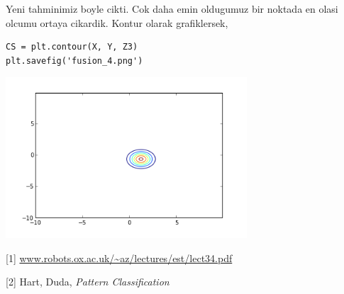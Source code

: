 \documentclass[12pt,fleqn]{article}\usepackage{../common}
\begin{document}
Yeni tahminimiz boyle cikti. Cok daha emin oldugumuz bir noktada en olasi
olcumu ortaya cikardik. Kontur olarak grafiklersek,

\begin{verbatim}
CS = plt.contour(X, Y, Z3)
plt.savefig('fusion_4.png')
\end{verbatim}

\includegraphics[height=6cm]{fusion_4.png}


[1] \url{www.robots.ox.ac.uk/~az/lectures/est/lect34.pdf}

[2] Hart, Duda, {\em Pattern Classification}
\end{document}
